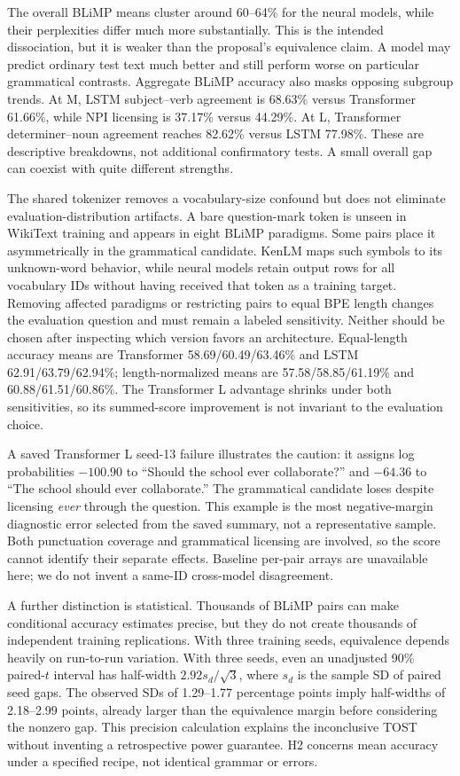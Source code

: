 \documentclass[10pt]{article}
\begin{document}
The overall BLiMP means cluster around 60--64\% for the neural models, while their perplexities differ much more substantially. This is the intended dissociation, but it is weaker than the proposal's equivalence claim. A model may predict ordinary test text much better and still perform worse on particular grammatical contrasts. Aggregate BLiMP accuracy also masks opposing subgroup trends. At M, LSTM subject--verb agreement is 68.63\% versus Transformer 61.66\%, while NPI licensing is 37.17\% versus 44.29\%. At L, Transformer determiner--noun agreement reaches 82.62\% versus LSTM 77.98\%. These are descriptive breakdowns, not additional confirmatory tests. A small overall gap can coexist with quite different strengths.

The shared tokenizer removes a vocabulary-size confound but does not eliminate evaluation-distribution artifacts. A bare question-mark token is unseen in WikiText training and appears in eight BLiMP paradigms. Some pairs place it asymmetrically in the grammatical candidate. KenLM maps such symbols to its unknown-word behavior, while neural models retain output rows for all vocabulary IDs without having received that token as a training target. Removing affected paradigms or restricting pairs to equal BPE length changes the evaluation question and must remain a labeled sensitivity. Neither should be chosen after inspecting which version favors an architecture. Equal-length accuracy means are Transformer 58.69/60.49/63.46\% and LSTM 62.91/63.79/62.94\%; length-normalized means are 57.58/58.85/61.19\% and 60.88/61.51/60.86\%. The Transformer L advantage shrinks under both sensitivities, so its summed-score improvement is not invariant to the evaluation choice.

A saved Transformer L seed-13 failure illustrates the caution: it assigns log probabilities $-100.90$ to ``Should the school ever collaborate?'' and $-64.36$ to ``The school should ever collaborate.'' The grammatical candidate loses despite licensing \emph{ever} through the question. This example is the most negative-margin diagnostic error selected from the saved summary, not a representative sample. Both punctuation coverage and grammatical licensing are involved, so the score cannot identify their separate effects. Baseline per-pair arrays are unavailable here; we do not invent a same-ID cross-model disagreement.

A further distinction is statistical. Thousands of BLiMP pairs can make conditional accuracy estimates precise, but they do not create thousands of independent training replications. With three training seeds, equivalence depends heavily on run-to-run variation. With three seeds, even an unadjusted 90\% paired-$t$ interval has half-width $2.92s_d/\sqrt{3}$, where $s_d$ is the sample SD of paired seed gaps. The observed SDs of 1.29--1.77 percentage points imply half-widths of 2.18--2.99 points, already larger than the equivalence margin before considering the nonzero gap. This precision calculation explains the inconclusive TOST without inventing a retrospective power guarantee. H2 concerns mean accuracy under a specified recipe, not identical grammar or errors.
\end{document}
